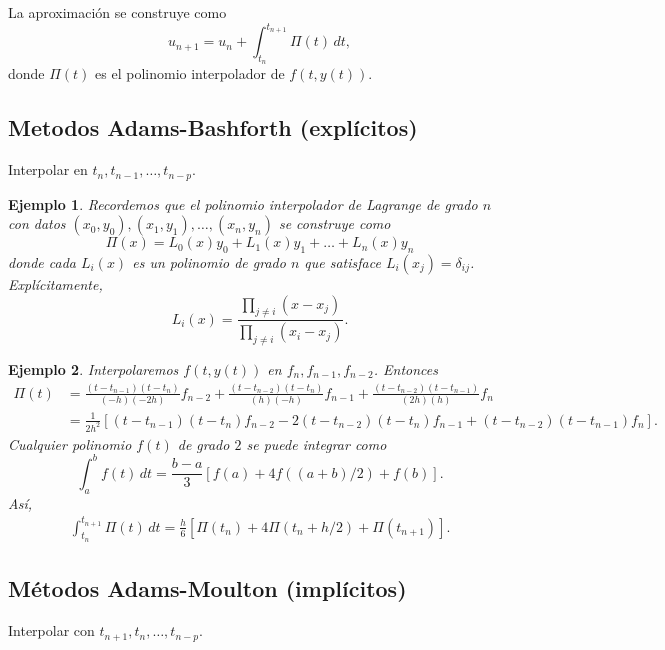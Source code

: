\documentclass[11pt,letterpaper]{report}
\newtheorem{example}{Ejemplo}
\begin{document}
La aproximación se construye como
\begin{equation}
  u_{n+1} = u_n + \int_{t_n}^{t_{n+1}}\Pi(t)\,dt,
\end{equation}
donde $\Pi(t)$ es el polinomio interpolador de $f(t,y(t))$.


\subsection{Metodos Adams-Bashforth (explícitos)}
Interpolar en $t_{n},t_{n-1},\dots,t_{n-p}$.

\begin{example}
  Recordemos que el polinomio interpolador de Lagrange de grado $n$ 
  con datos $(x_0,y_0),(x_1,y_1),\dots,(x_n,y_n)$ se construye como
  \begin{equation}
    \Pi(x) =  L_0(x)y_0 + L_1(x)y_1 + \dots + L_n(x)y_n
  \end{equation}
  donde cada $L_i(x)$ es un polinomio de grado $n$ que satisface
  $L_i(x_j)=\delta_{ij}$. Explícitamente,
  \begin{equation}
    L_i(x) = \frac{\prod_{j\neq i}(x-x_j)}{\prod_{j\neq i}(x_i-x_j)}
  .\end{equation}
\end{example}

\begin{example}
  Interpolaremos $f(t,y(t))$ en $f_n,f_{n-1},f_{n-2}$. Entonces
  \begin{align}
    \Pi(t)
    &= \frac{(t-t_{n-1})(t-t_n)}{(-h)(-2h)}f_{n-2}
    +  \frac{(t-t_{n-2})(t-t_n)}{(h)(-h)}f_{n-1}
    +  \frac{(t-t_{n-2})(t-t_{n-1})}{(2h)(h)}f_{n}
    \\
    &=
    \frac{1}{2h^{2}}
    \left[
      (t-t_{n-1})(t-t_n)f_{n-2}
    - 2(t-t_{n-2})(t-t_n)f_{n-1}
    + (t-t_{n-2})(t-t_{n-1})f_{n}
    \right]
  .\end{align}
  Cualquier polinomio $f(t)$ de grado $2$ se puede integrar como
  \begin{equation}
    \int_{a}^{b}f(t)\,dt = \frac{b-a}{3}[f(a)+4f((a+b)/2)+f(b)]
  .\end{equation}
  Así,
  \begin{align}
     \int_{t_n}^{t_{n+1}}\Pi(t)\,dt
     =
     \frac{h}{6}[\Pi(t_{n})+4\Pi(t_{n}+h / 2)+\Pi(t_{n+1})]
  .\end{align}
\end{example}

\subsection{Métodos Adams-Moulton (implícitos)}
Interpolar con $t_{n+1},t_n,\dots,t_{n-p}$.
\end{document}
